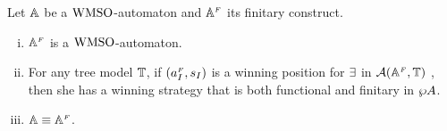 \begin{theorem}
\label{PROP_facts_finConstrwmso}
Let $\mathbb{A}$ be a $\mathrm{WMSO}$-automaton and $\mathbb{A}^{{\scriptscriptstyle F}}$ its finitary construct.
\begin{enumerate}[(i)]
   pt
  \item $\mathbb{A}^{{\scriptscriptstyle F}}$ is a $\mathrm{WMSO}$-automaton.\label{point:finConstrAut}
\item 
For any tree model $\mathbb{T}$, if $(a_I^{{\scriptscriptstyle F}},s_I)$ is a winning position for 
$\exists$ in $\mathcal{A}(\mathbb{A}^{{\scriptscriptstyle F}},\mathbb{T})$ , then she has a winning strategy that
is both functional and finitary in $\wp A$.
  \label{point:finConstrStrategy}
\item $\mathbb{A} \equiv \mathbb{A}^{{\scriptscriptstyle F}}$. \label{point:finConstrEquiv}
  \end{enumerate}
\end{theorem}
